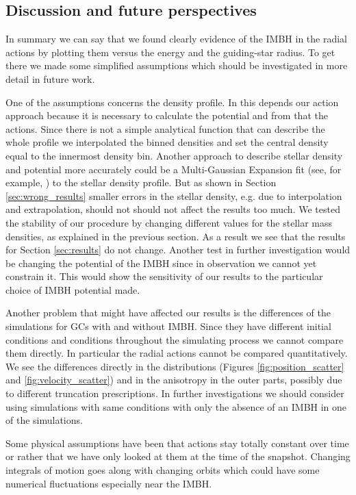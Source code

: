 \subsection{Discussion and future perspectives}\label{sec:discussion}
In summary we can say that we found clearly evidence of the \ac{IMBH} in the radial actions by plotting them versus the energy and the guiding-star radius. To get there we made some simplified assumptions which should be investigated in more detail in future work. 
\par One of the assumptions concerns the density profile. In this depends our action approach because it is necessary to calculate the potential and from that the actions. Since there is not a simple analytical function that can describe the whole profile we interpolated the binned densities and set the central density equal to the innermost density bin. Another approach to describe stellar density and potential more accurately could be a Multi-Gaussian Expansion fit (see, for example, \citealp{1994A&A...285..723E,2002MNRAS.333..400C}) to the stellar density profile. But as shown in Section \ref{sec:wrong_results} smaller errors in the stellar density, e.g. due to interpolation and extrapolation, should not should not affect the results too much. We tested the stability of our procedure by changing different values for the stellar mass densities, as explained in the previous section. As a result we see that the results for Section \ref{sec:results} do not change. Another test in further investigation would be changing the potential of the \ac{IMBH} since in observation we cannot yet constrain it. This would show the sensitivity of our results to the particular choice of \ac{IMBH} potential made.
\par Another problem that might have affected our results is the differences of the simulations for \acp{GC} with and without \ac{IMBH}. Since they have different initial conditions and conditions throughout the simulating process we cannot compare them directly. In particular the radial actions cannot be compared quantitatively. We see the differences directly in the distributions (Figures \ref{fig:position_scatter} and \ref{fig:velocity_scatter}) and in the anisotropy in the outer parts, possibly due to different truncation prescriptions. In further investigations we should consider using simulations with same conditions with only the absence of an \ac{IMBH} in one of the simulations. 
\par Some physical assumptions have been that actions stay totally constant over time or rather that we have only looked at them at the time of the snapshot. Changing integrals of motion goes along with changing orbits which could have some numerical fluctuations especially near the \ac{IMBH}. 
